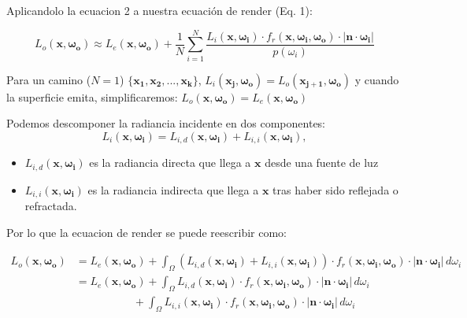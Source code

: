\documentclass{article}
\begin{document}
Aplicandolo la ecuacion 2 a nuestra ecuación de render (Eq. 1):

\begin{equation}
  L_o(\mathbf{x}, \mathbf{\omega_{o}}) \approx L_e(\mathbf{x}, \mathbf{\omega_{o}}) + \frac{1}{N} \sum_{i=1}^{N} \frac{L_i(\mathbf{x}, \mathbf{\omega_{i}}) \cdot f_r(\mathbf{x}, \mathbf{\omega_{i}}, \mathbf{\omega_{o}}) \cdot  |\mathbf{n} \cdot \mathbf{\omega_{i}}|}{p(\omega_{i})}
\end{equation}

Para un camino (\(N=1\))
\(\{\mathbf{x_{1}}, \mathbf{x_{2}}, ..., \mathbf{x_{k}}\}\),
\(L_{i}(\mathbf{x_{j}}, \mathbf{\omega_{o}})=L_{o}(\mathbf{x_{j+1}}, \mathbf{\omega_{o}})\)
y cuando la superficie emita, simplificaremos:
\(L_{o}(\mathbf{x}, \mathbf{\omega_{o}})=L_{e}(\mathbf{x}, \mathbf{\omega_{o}})\)

Podemos descomponer la radiancia incidente en dos componentes:
\[L_i(\mathbf{x}, \mathbf{\omega_{i}}) = L_{i,d}(\mathbf{x}, \mathbf{\omega_{i}}) + L_{i,i}(\mathbf{x}, \mathbf{\omega_{i}}),\]

\begin{itemize}
  \item \(L_{i,d}(\mathbf{x}, \mathbf{\omega_{i}})\) es la radiancia directa que
        llega a \(\mathbf{x}\) desde una fuente de luz
  \item \(L_{i,i}(\mathbf{x}, \mathbf{\omega_{i}})\) es la radiancia indirecta
        que llega a \(\mathbf{x}\) tras haber sido reflejada o refractada.
\end{itemize}

Por lo que la ecuacion de render se puede reescribir como:

\begin{equation}
  \begin{split}
    L_o(\mathbf{x}, \mathbf{\omega_{o}}) & = L_e(\mathbf{x}, \mathbf{\omega_{o}}) + \int_{\Omega} (L_{i,d}(\mathbf{x}, \mathbf{\omega_{i}}) + L_{i,i}(\mathbf{x}, \mathbf{\omega_{i}})) \cdot f_r(\mathbf{x}, \mathbf{\omega_{i}}, \mathbf{\omega_{o}}) \cdot  |\mathbf{n} \cdot \mathbf{\omega_{i}}| \, d\omega_{i} \\
                                         & = L_e(\mathbf{x}, \mathbf{\omega_{o}})
                                           + \int_{\Omega} L_{i,d}(\mathbf{x}, \mathbf{\omega_{i}}) \cdot f_r(\mathbf{x}, \mathbf{\omega_{i}}, \mathbf{\omega_{o}}) \cdot  |\mathbf{n} \cdot \mathbf{\omega_{i}}| \, d\omega_{i} \\
                                         &\quad\quad\quad\quad\quad\  + \int_{\Omega} L_{i,i}(\mathbf{x}, \mathbf{\omega_{i}}) \cdot f_r(\mathbf{x}, \mathbf{\omega_{i}}, \mathbf{\omega_{o}}) \cdot  |\mathbf{n} \cdot \mathbf{\omega_{i}}| \, d\omega_{i} \\
  \end{split}
\end{equation}
\end{document}

